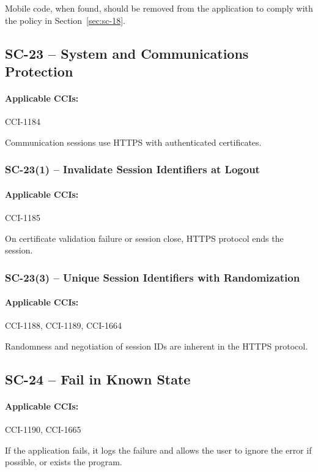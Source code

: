 \documentclass[letterpaper, 10pt, twoside]{article}
\begin{document}
Mobile code, when found, should be removed from the application to comply with the policy in Section~\ref{sec:sc-18}.

\subsection{SC-23 -- System and Communications Protection}

\paragraph{Applicable CCIs:} CCI-1184

Communication sessions use HTTPS with authenticated certificates.

\subsubsection{SC-23(1) -- Invalidate Session Identifiers at Logout}

\paragraph{Applicable CCIs:} CCI-1185

On certificate validation failure or session close, HTTPS protocol ends the session.

\subsubsection{SC-23(3) -- Unique Session Identifiers with Randomization}

\paragraph{Applicable CCIs:} CCI-1188, CCI-1189, CCI-1664

Randomness and negotiation of session IDs are inherent in the HTTPS protocol.

\subsection{SC-24 -- Fail in Known State}

\paragraph{Applicable CCIs:} CCI-1190, CCI-1665

If the application fails, it logs the failure and allows the user to ignore the error if possible, or exists the program.
\end{document}
